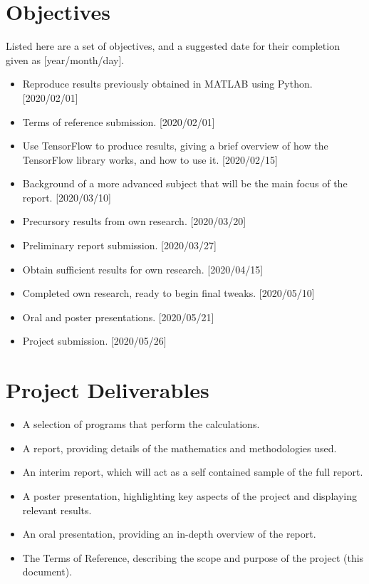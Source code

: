 \section*{Objectives}
Listed here are a set of objectives, and a suggested date for their completion
given as [year/month/day].
\begin{itemize}
    \item Reproduce results previously obtained in MATLAB using Python.
        [2020/02/01]

    \item Terms of reference submission. [2020/02/01]

    \item Use TensorFlow to produce results, giving a brief overview of how the
        TensorFlow library works, and how to use it. [2020/02/15]

    \item Background of a more advanced subject that will be the main focus of
        the report. [2020/03/10]

    \item Precursory results from own research. [2020/03/20]

    \item Preliminary report submission. [2020/03/27]

    \item Obtain sufficient results for own research. [2020/04/15]

    \item Completed own research, ready to begin final tweaks. [2020/05/10]

    \item Oral and poster presentations. [2020/05/21]

    \item Project submission. [2020/05/26]
\end{itemize}

\section*{Project Deliverables}
\begin{itemize}
    \item A selection of programs that perform the calculations.

    \item A report, providing details of the mathematics and methodologies used.

    \item An interim report, which will act as a self contained sample of the
        full report.

    \item A poster presentation, highlighting key aspects of the project and
        displaying relevant results.

    \item An oral presentation, providing an in-depth overview of the report.

    \item The Terms of Reference, describing the scope and purpose of the
        project (this document).
\end{itemize}

